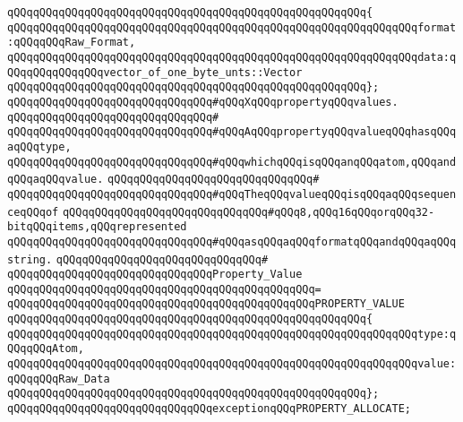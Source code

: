 \verb|qQQqqQQqqQQqqQQqqQQqqQQqqQQqqQQqqQQqqQQqqQQqqQQqqQQqqQQq{|\newline
\verb|qQQqqQQqqQQqqQQqqQQqqQQqqQQqqQQqqQQqqQQqqQQqqQQqqQQqqQQqqQQqqQQqformat:qQQqqQQqRaw_Format,|\newline
\verb|qQQqqQQqqQQqqQQqqQQqqQQqqQQqqQQqqQQqqQQqqQQqqQQqqQQqqQQqqQQqqQQqdata:qQQqqQQqqQQqqQQqvector_of_one_byte_unts::Vector|\newline
\verb|qQQqqQQqqQQqqQQqqQQqqQQqqQQqqQQqqQQqqQQqqQQqqQQqqQQqqQQq};|\newline
\newline
\verb|qQQqqQQqqQQqqQQqqQQqqQQqqQQqqQQq#qQQqXqQQqpropertyqQQqvalues.|\newline
\verb|qQQqqQQqqQQqqQQqqQQqqQQqqQQqqQQq#|\newline
\verb|qQQqqQQqqQQqqQQqqQQqqQQqqQQqqQQq#qQQqAqQQqpropertyqQQqvalueqQQqhasqQQqaqQQqtype,|\newline
\verb|qQQqqQQqqQQqqQQqqQQqqQQqqQQqqQQq#qQQqwhichqQQqisqQQqanqQQqatom,qQQqandqQQqaqQQqvalue.|\newline
\verb|qQQqqQQqqQQqqQQqqQQqqQQqqQQqqQQq#|\newline
\verb|qQQqqQQqqQQqqQQqqQQqqQQqqQQqqQQq#qQQqTheqQQqvalueqQQqisqQQqaqQQqsequenceqQQqof|\newline
\verb|qQQqqQQqqQQqqQQqqQQqqQQqqQQqqQQq#qQQq8,qQQq16qQQqorqQQq32-bitqQQqitems,qQQqrepresented|\newline
\verb|qQQqqQQqqQQqqQQqqQQqqQQqqQQqqQQq#qQQqasqQQqaqQQqformatqQQqandqQQqaqQQqstring.|\newline
\verb|qQQqqQQqqQQqqQQqqQQqqQQqqQQqqQQq#|\newline
\verb|qQQqqQQqqQQqqQQqqQQqqQQqqQQqqQQqProperty_Value|\newline
\verb|qQQqqQQqqQQqqQQqqQQqqQQqqQQqqQQqqQQqqQQqqQQqqQQq=|\newline
\verb|qQQqqQQqqQQqqQQqqQQqqQQqqQQqqQQqqQQqqQQqqQQqqQQqPROPERTY_VALUE|\newline
\verb|qQQqqQQqqQQqqQQqqQQqqQQqqQQqqQQqqQQqqQQqqQQqqQQqqQQqqQQq{|\newline
\verb|qQQqqQQqqQQqqQQqqQQqqQQqqQQqqQQqqQQqqQQqqQQqqQQqqQQqqQQqqQQqqQQqtype:qQQqqQQqAtom,|\newline
\verb|qQQqqQQqqQQqqQQqqQQqqQQqqQQqqQQqqQQqqQQqqQQqqQQqqQQqqQQqqQQqqQQqvalue:qQQqqQQqRaw_Data|\newline
\verb|qQQqqQQqqQQqqQQqqQQqqQQqqQQqqQQqqQQqqQQqqQQqqQQqqQQqqQQq};|\newline
\newline
\verb|qQQqqQQqqQQqqQQqqQQqqQQqqQQqqQQqexceptionqQQqPROPERTY_ALLOCATE;|\newline
